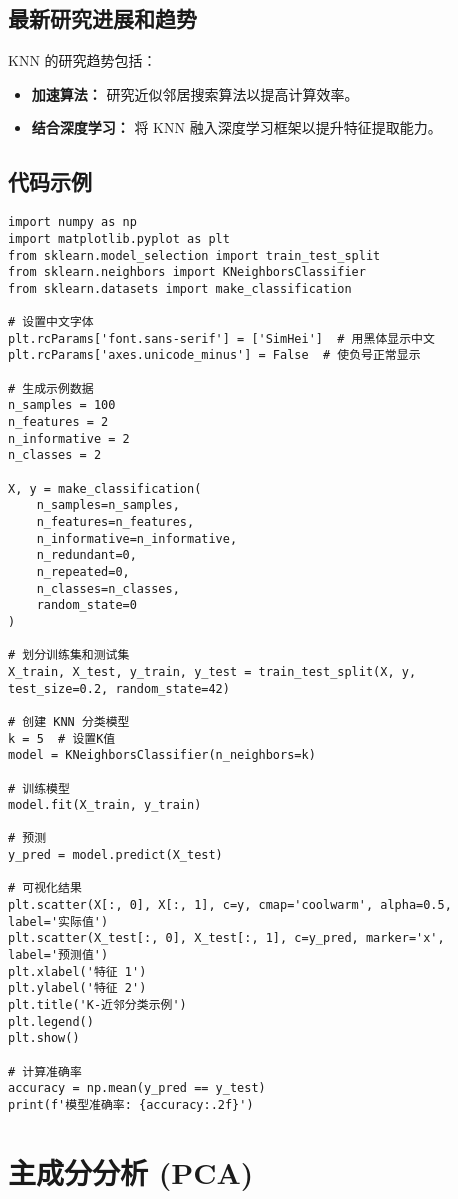 \subsection*{最新研究进展和趋势}
KNN 的研究趋势包括：
\begin{itemize}
    \item \textbf{加速算法：} 研究近似邻居搜索算法以提高计算效率。
    \item \textbf{结合深度学习：} 将 KNN 融入深度学习框架以提升特征提取能力。
\end{itemize}
\subsection*{代码示例}
\begin{lstlisting}
import numpy as np
import matplotlib.pyplot as plt
from sklearn.model_selection import train_test_split
from sklearn.neighbors import KNeighborsClassifier
from sklearn.datasets import make_classification

# 设置中文字体
plt.rcParams['font.sans-serif'] = ['SimHei']  # 用黑体显示中文
plt.rcParams['axes.unicode_minus'] = False  # 使负号正常显示

# 生成示例数据
n_samples = 100
n_features = 2
n_informative = 2
n_classes = 2

X, y = make_classification(
    n_samples=n_samples,
    n_features=n_features,
    n_informative=n_informative,
    n_redundant=0,
    n_repeated=0,
    n_classes=n_classes,
    random_state=0
)

# 划分训练集和测试集
X_train, X_test, y_train, y_test = train_test_split(X, y, test_size=0.2, random_state=42)

# 创建 KNN 分类模型
k = 5  # 设置K值
model = KNeighborsClassifier(n_neighbors=k)

# 训练模型
model.fit(X_train, y_train)

# 预测
y_pred = model.predict(X_test)

# 可视化结果
plt.scatter(X[:, 0], X[:, 1], c=y, cmap='coolwarm', alpha=0.5, label='实际值')
plt.scatter(X_test[:, 0], X_test[:, 1], c=y_pred, marker='x', label='预测值')
plt.xlabel('特征 1')
plt.ylabel('特征 2')
plt.title('K-近邻分类示例')
plt.legend()
plt.show()

# 计算准确率
accuracy = np.mean(y_pred == y_test)
print(f'模型准确率: {accuracy:.2f}')

\end{lstlisting}


\section{主成分分析 (PCA)}
